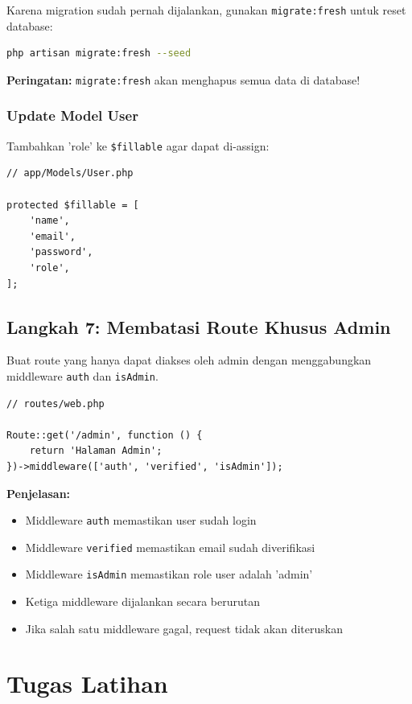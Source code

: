 \documentclass[a4paper,oneside,11pt]{book}
\begin{document}
Karena migration sudah pernah dijalankan, gunakan \texttt{migrate:fresh} untuk reset database:

\begin{lstlisting}[language=bash]
php artisan migrate:fresh --seed
\end{lstlisting}

\textbf{Peringatan:} \texttt{migrate:fresh} akan menghapus semua data di database!

\subsection{Update Model User}

Tambahkan 'role' ke \texttt{\$fillable} agar dapat di-assign:

\begin{lstlisting}[style=phpstyle]
// app/Models/User.php

protected $fillable = [
    'name',
    'email',
    'password',
    'role',
];
\end{lstlisting}

\section{Langkah 7: Membatasi Route Khusus Admin}

Buat route yang hanya dapat diakses oleh admin dengan menggabungkan middleware \texttt{auth} dan \texttt{isAdmin}.

\begin{lstlisting}[style=phpstyle]
// routes/web.php

Route::get('/admin', function () {
    return 'Halaman Admin';
})->middleware(['auth', 'verified', 'isAdmin']);
\end{lstlisting}

\textbf{Penjelasan:}
\begin{itemize}
    \item Middleware \texttt{auth} memastikan user sudah login
    \item Middleware \texttt{verified} memastikan email sudah diverifikasi
    \item Middleware \texttt{isAdmin} memastikan role user adalah 'admin'
    \item Ketiga middleware dijalankan secara berurutan
    \item Jika salah satu middleware gagal, request tidak akan diteruskan
\end{itemize}

\chapter{Tugas Latihan}
\end{document}
